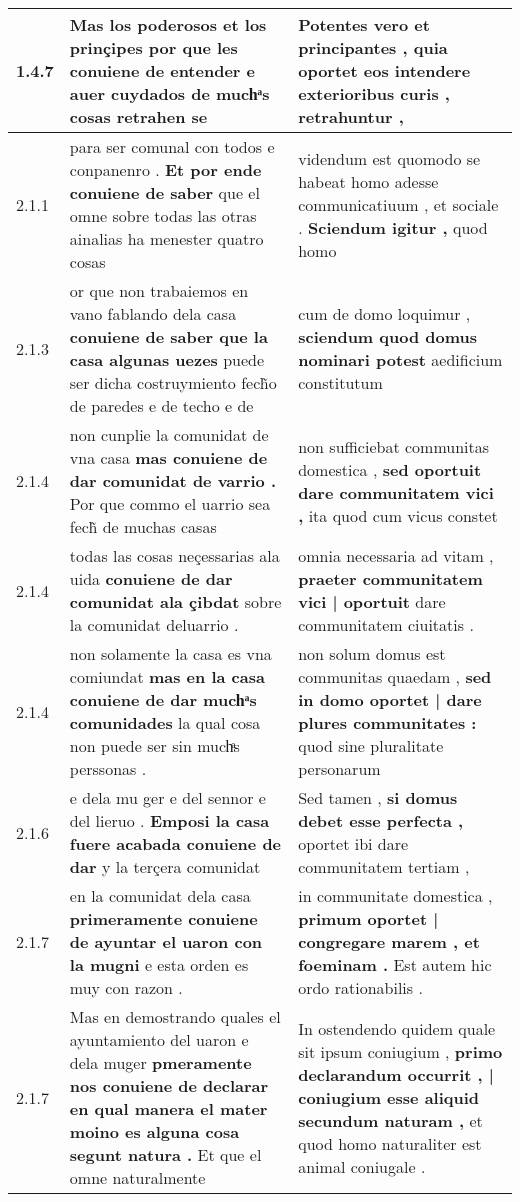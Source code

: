 \begin{tabular}{|p{1cm}|p{6.5cm}|p{6.5cm}|}
1.4.7 & Mas los poderosos et los prinçipes \textbf{ por que les conuiene de entender } e auer cuydados de muchͣs cosas retrahen se & Potentes vero et principantes , \textbf{ quia oportet eos intendere exterioribus curis , } retrahuntur , \\\hline
2.1.1 & para ser comunal con todos e conpanenro . \textbf{ Et por ende conuiene de saber } que el omne sobre todas las otras ainalias ha menester quatro cosas & videndum est quomodo se habeat homo adesse communicatiuum , et sociale . \textbf{ Sciendum igitur , } quod homo \\\hline
2.1.3 & or que non trabaiemos en vano fablando dela casa \textbf{ conuiene de saber que la casa algunas uezes } puede ser dicha costruymiento fech̃o de paredes e de techo e de & cum de domo loquimur , \textbf{ sciendum quod domus nominari potest } aedificium constitutum \\\hline
2.1.4 & non cunplie la comunidat de vna casa \textbf{ mas conuiene de dar comunidat de varrio . } Por que commo el uarrio sea fech̃ de muchas casas & non sufficiebat communitas domestica , \textbf{ sed oportuit dare communitatem vici , } ita quod cum vicus constet \\\hline
2.1.4 & todas las cosas neçessarias ala uida \textbf{ conuiene de dar comunidat ala çibdat } sobre la comunidat deluarrio . & omnia necessaria ad vitam , \textbf{ praeter communitatem vici | oportuit } dare communitatem ciuitatis . \\\hline
2.1.4 & non solamente la casa es vna comiundat \textbf{ mas en la casa conuiene de dar muchͣs comunidades } la qual cosa non puede ser sin muchͣs perssonas . & non solum domus est communitas quaedam , \textbf{ sed in domo oportet | dare plures communitates : } quod sine pluralitate personarum \\\hline
2.1.6 & e dela mu ger e del sennor e del lieruo . \textbf{ Emposi la casa fuere acabada conuiene de dar } y la terçera comunidat & Sed tamen , \textbf{ si domus debet esse perfecta , } oportet ibi dare communitatem tertiam , \\\hline
2.1.7 & en la comunidat dela casa \textbf{ primeramente conuiene de ayuntar el uaron con la mugni } e esta orden es muy con razon . & in communitate domestica , \textbf{ primum oportet | congregare marem , et foeminam . } Est autem hic ordo rationabilis . \\\hline
2.1.7 & Mas en demostrando quales el ayuntamiento del uaron e dela muger \textbf{ pmeramente nos conuiene de declarar en qual manera el mater moino es alguna cosa segunt natura . } Et que el omne naturalmente & In ostendendo quidem quale sit ipsum coniugium , \textbf{ primo declarandum occurrit , | coniugium esse aliquid secundum naturam , } et quod homo naturaliter est animal coniugale . \\\hline

\end{tabular}
